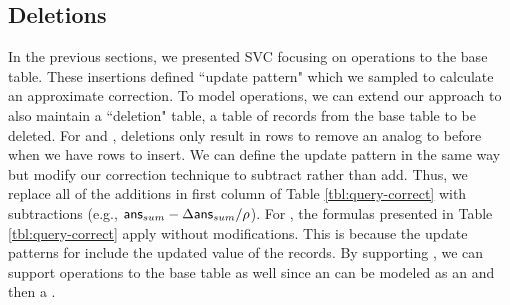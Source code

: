 

\subsection{Deletions}\label{sec:del}
In the previous sections, we presented SVC focusing on \insertion operations to the base table.
These insertions defined ``update pattern" which we sampled to calculate an approximate correction.
To model \delete operations, we can extend our approach to also maintain a ``deletion" table, a table of records from the base table to be deleted. 
For \fjview and \spview, deletions only result in rows to remove an analog to before when we have rows to insert.
We can define the update pattern in the same way but modify our correction technique to subtract rather than add.
Thus, we replace all of the additions in first column of Table \ref{tbl:query-correct} with subtractions  (e.g., $\textsf{ans}_{sum}-\Delta\textsf{ans}_{sum}/\rho $).
For \aggview, the formulas presented in Table \ref{tbl:query-correct} apply without modifications.
This is because the update patterns for \aggview include the updated value of the records.
By supporting \delete, we can support \update operations to the base table as well since an \update can be modeled as an \insertion and then a \delete.

